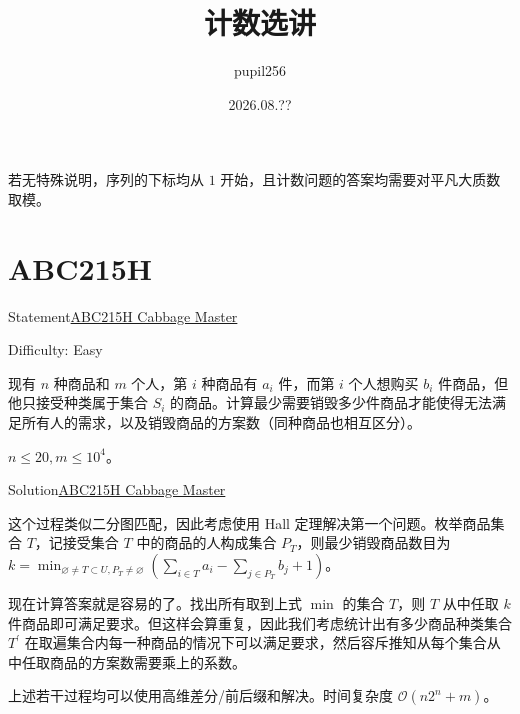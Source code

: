 \documentclass{beamer}
\title{计数选讲}
\author{pupil256}
\date{2026.08.??}
\subtitle{}
\institute{ASDFZ}
\begin{document}
    
    \begin{frame}
        \titlepage
    \end{frame}

    \begin{frame}{}

        若无特殊说明，序列的下标均从 $1$ 开始，且计数问题的答案均需要对平凡大质数取模。
		
	\end{frame}

    \begin{frame}
        \tableofcontents[sectionstyle=show,subsectionstyle=show/shaded/hide,subsubsectionstyle=show/shaded/hide]
    \end{frame}

    \section{ABC215H}
	
	\begin{frame}{Statement}{\href{hhttps://atcoder.jp/contests/abc215/tasks/abc215_h}{ABC215H Cabbage Master}}

        Difficulty: Easy

        现有 $n$ 种商品和 $m$ 个人，第 $i$ 种商品有 $a_{i}$ 件，而第 $i$ 个人想购买 $b_{i}$ 件商品，但他只接受种类属于集合 $S_{i}$ 的商品。计算最少需要销毁多少件商品才能使得无法满足所有人的需求，以及销毁商品的方案数（同种商品也相互区分）。

        $n \leq 20, m \leq 10^{4}$。
		
	\end{frame}

    \begin{frame}{Solution}{\href{hhttps://atcoder.jp/contests/abc215/tasks/abc215_h}{ABC215H Cabbage Master}}

        这个过程类似二分图匹配，因此考虑使用 Hall 定理解决第一个问题。枚举商品集合 $T$，记接受集合 $T$ 中的商品的人构成集合 $P_{T}$，则最少销毁商品数目为 $k = \min_{\varnothing \neq T \subset U, P_{T} \neq \varnothing}(\sum\limits_{i \in T}a_{i} - \sum\limits_{j \in P_{T}}b_{j} + 1)$。

        \pause
        
        现在计算答案就是容易的了。找出所有取到上式 $\min$ 的集合 $T$，则 $T$ 从中任取 $k$ 件商品即可满足要求。但这样会算重复，因此我们考虑统计出有多少商品种类集合 $T^{\prime}$ 在取遍集合内每一种商品的情况下可以满足要求，然后容斥推知从每个集合从中任取商品的方案数需要乘上的系数。

        \pause

        上述若干过程均可以使用高维差分/前后缀和解决。时间复杂度 $\mathcal{O}(n2^{n} + m)$。
		
	\end{frame}
\end{document}
